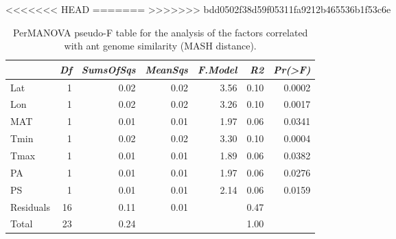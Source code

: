 <<<<<<< HEAD
=======
>>>>>>> bdd0502f38d59f05311fa9212b465536b1f53c6e
\begin{table}[ht]
\centering
\begin{tabular}{lrrrrrr}
  \hline
 & {\emph{Df}} & {\emph{SumsOfSqs}} & {\emph{MeanSqs}} & {\emph{F.Model}} & {\emph{R2}} & {\emph{Pr(>F)}} \\ 
  \hline
Lat & 1 & 0.02 & 0.02 & 3.56 & 0.10 & 0.0002 \\ 
  Lon & 1 & 0.02 & 0.02 & 3.26 & 0.10 & 0.0017 \\ 
  MAT & 1 & 0.01 & 0.01 & 1.97 & 0.06 & 0.0341 \\ 
  Tmin & 1 & 0.02 & 0.02 & 3.30 & 0.10 & 0.0004 \\ 
  Tmax & 1 & 0.01 & 0.01 & 1.89 & 0.06 & 0.0382 \\ 
  PA & 1 & 0.01 & 0.01 & 1.97 & 0.06 & 0.0276 \\ 
  PS & 1 & 0.01 & 0.01 & 2.14 & 0.06 & 0.0159 \\ 
  Residuals & 16 & 0.11 & 0.01 &  & 0.47 &  \\ 
  Total & 23 & 0.24 &  &  & 1.00 &  \\ 
   \hline
\end{tabular}
\caption{PerMANOVA pseudo-F table for the analysis of the factors 
correlated with ant genome similarity (MASH distance).} 
\label{tab:perm_mash}
\end{table}
